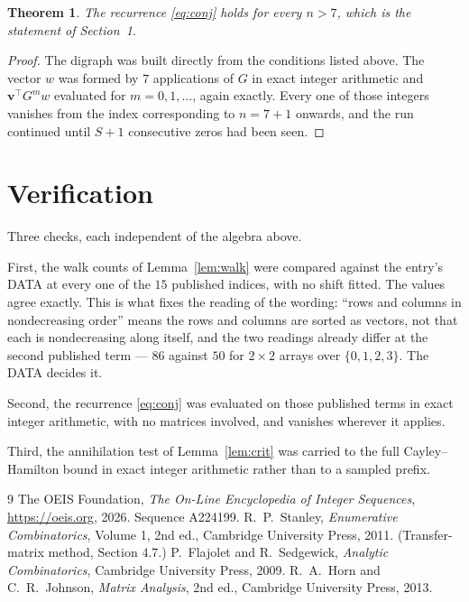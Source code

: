 \documentclass[11pt,a4paper]{article}
\theoremstyle{plain}
\newtheorem{theorem}{Theorem}
\theoremstyle{definition}
\begin{document}
\begin{theorem}
The recurrence \eqref{eq:conj} holds for every $n>7$, which is the statement of
Section~1.
\end{theorem}

\begin{proof}
The digraph was built directly from the conditions listed above. The vector $w$ was formed by
$7$ applications of $G$ in exact integer arithmetic and $\mathbf{v}^{\!\top}G^{m}w$
evaluated for $m=0,1,\dots$, again exactly. Every one of those integers vanishes from the
index corresponding to $n=7+1$ onwards, and the run continued until $S+1$ consecutive
zeros had been seen.
\end{proof}

\section{Verification}

Three checks, each independent of the algebra above.

First, the walk counts of Lemma~\ref{lem:walk} were compared against the entry's DATA at
every one of the $15$ published indices, with no shift fitted. The values agree exactly.
This is what fixes the reading of the wording: ``rows and columns in nondecreasing order''
means the rows and columns are sorted as vectors, not that each is nondecreasing along
itself, and the two readings already differ at the second published term --- $86$ against
$50$ for $2\times2$ arrays over $\{0,1,2,3\}$. The DATA decides it.

Second, the recurrence \eqref{eq:conj} was evaluated on those published terms in exact
integer arithmetic, with no matrices involved, and vanishes wherever it applies.

Third, the annihilation test of Lemma~\ref{lem:crit} was carried to the full
Cayley--Hamilton bound in exact integer arithmetic rather than to a sampled prefix.

\begin{thebibliography}{9}
 The OEIS Foundation, \emph{The On-Line Encyclopedia of Integer
Sequences}, \url{https://oeis.org}, 2026. Sequence A224199.
 R.~P.~Stanley, \emph{Enumerative Combinatorics}, Volume 1, 2nd ed.,
Cambridge University Press, 2011. (Transfer-matrix method, Section 4.7.)
 P.~Flajolet and R.~Sedgewick, \emph{Analytic Combinatorics}, Cambridge
University Press, 2009.
 R.~A.~Horn and C.~R.~Johnson, \emph{Matrix Analysis}, 2nd ed., Cambridge
University Press, 2013.
\end{thebibliography}
\end{document}
